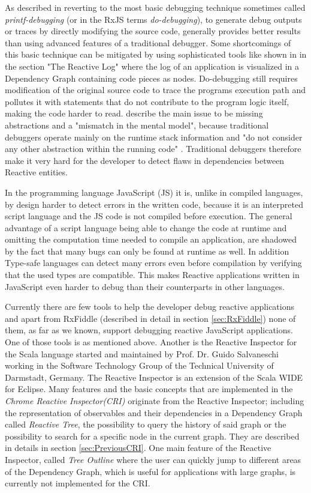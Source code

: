 As described in \cite{MSDN_DebugginObservables} reverting to the most basic debugging technique sometimes called \emph{printf-debugging} (or in the RxJS terms \emph{do-debugging}), to generate debug outputs or traces by directly modifying the source code, generally provides better results than using advanced features of a traditional debugger. Some shortcomings of this basic technique can be mitigated by using sophisticated tools like shown in \cite{ShinyGraphFromLog} in the section "The Reactive Log" where the log of an application is visualized in a Dependency Graph containing code pieces as nodes. Do-debugging still requires modification of the original source code to trace the programs execution path and pollutes it with statements that do not contribute to the program logic itself, making the code harder to read. \cite{PaperReactiveProgramming} describe the main issue to be missing abstractions and a "mismatch in the mental model", because traditional debuggers operate mainly on the runtime stack information and "do not consider any other abstraction within the running code" \cite{ThesisAbbas}. Traditional debuggers therefore make it very hard for the developer to detect flaws in dependencies between Reactive entities.

In the programming language JavaScript (JS) it is, unlike in compiled languages, by design harder to detect errors in the written code, because it is an interpreted script language and the JS code is not compiled before execution. The general advantage of a script language being able to change the code at runtime and omitting the computation time needed to compile an application, are shadowed by the fact that many bugs can only be found at runtime as well. In addition Type-safe languages can detect many errors even before compilation by verifying that the used types are compatible. This makes Reactive applications written in JavaScript even harder to debug than their counterparts in other languages.

Currently there are few tools to help the developer debug reactive applications and apart from RxFiddle (described in detail in section \ref{sec:RxFiddle}) none of them, as far as we known, support debugging reactive JavaScript applications. One of those tools is \cite{ShinyGraphFromLog} as mentioned above. Another is the Reactive Inspector for the Scala language \cite{ReactiveInspector} started and maintained by Prof. Dr. Guido Salvaneschi working in the Software Technology Group of the Technical University of Darmstadt, Germany.
The Reactive Inspector is an extension of the Scala WIDE for Eclipse. Many features and the basic concepts that are implemented in the \emph{Chrome Reactive Inspector(CRI)} originate from the Reactive Inspector; including the representation of observables and their dependencies in a Dependency Graph called \emph{Reactive Tree}, the possibility to query the history of said %
 graph or the possibility to search for a specific node in the current graph. They are described in details in section \ref{sec:PreviousCRI}. One main feature of the Reactive Inspector, called \emph{Tree Outline} where the user can quickly jump to different areas of the Dependency Graph, which is useful for applications with large graphs, is currently not implemented for the CRI.

